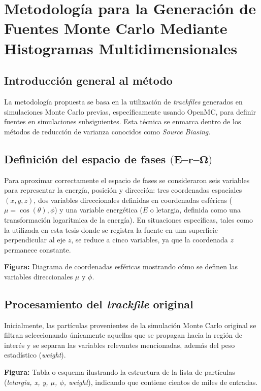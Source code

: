 \chapter{Metodología para la Generación de Fuentes Monte Carlo Mediante Histogramas Multidimensionales}

\section{Introducción general al método}
La metodología propuesta se basa en la utilización de \emph{trackfiles} generados en simulaciones Monte Carlo previas, específicamente usando OpenMC, para definir fuentes en simulaciones subsiguientes. Esta técnica se enmarca dentro de los métodos de reducción de varianza conocidos como \textit{Source Biasing}.

\section{Definición del espacio de fases \texorpdfstring{$(\mathbf{E}$--$\mathbf{r}$--$\boldsymbol{\Omega})$}{(E--r--Omega)}}
Para aproximar correctamente el espacio de fases se consideraron seis variables para representar la energía, posición y dirección: tres coordenadas espaciales $(x, y, z)$, dos variables direccionales definidas en coordenadas esféricas ($\mu = \cos(\theta), \phi$) y una variable energética ($E$ o letargia, definida como una transformación logarítmica de la energía). En situaciones específicas, tales como la utilizada en esta tesis donde se registra la fuente en una superficie perpendicular al eje $z$, se reduce a cinco variables, ya que la coordenada $z$ permanece constante.

\textbf{Figura:} Diagrama de coordenadas esféricas mostrando cómo se definen las variables direccionales $\mu$ y $\phi$.

\section{Procesamiento del \emph{trackfile} original}
Inicialmente, las partículas provenientes de la simulación Monte Carlo original se filtran seleccionando únicamente aquellas que se propagan hacia la región de interés y se separan las variables relevantes mencionadas, además del peso estadístico (\textit{weight}).

\textbf{Figura:} Tabla o esquema ilustrando la estructura de la lista de partículas (\textit{letargia, x, y, $\mu$, $\phi$, weight}), indicando que contiene cientos de miles de entradas.


